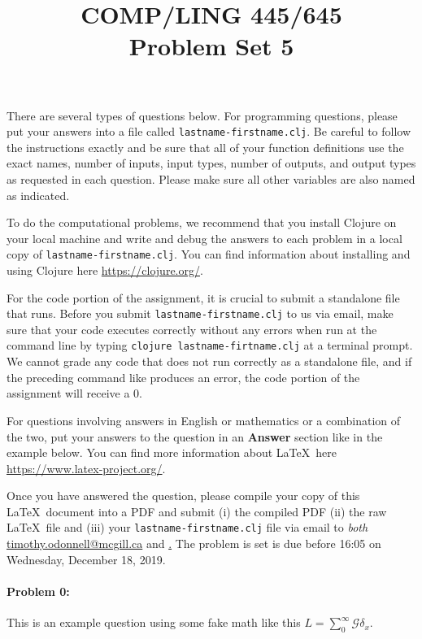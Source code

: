 \documentclass[10pt]{article}
\begin{document}
 
\title{COMP/LING 445/645\\Problem Set 5}
\date{}
\maketitle

There are several types of questions below. For programming questions,
please put your answers into a file called
\texttt{lastname-firstname.clj}. Be careful to follow the instructions
exactly and be sure that all of your function definitions use the
exact names, number of inputs, input types, number of outputs, and
output types as requested in each question. Please make sure all other
variables are also named as indicated.

To do the computational problems, we recommend that you install
Clojure on your local machine and write and debug the answers to each
problem in a local copy of \texttt{lastname-firstname.clj}. You can
find information about installing and using Clojure here
\url{https://clojure.org/}.

For the code portion of the assignment, it is crucial to submit a
standalone file that runs. Before you submit
\texttt{lastname-firstname.clj} to us via email, make sure that your
code executes correctly without any errors when run at the command
line by typing \texttt{clojure lastname-firtname.clj} at a terminal
prompt. We cannot grade any code that does not run correctly as a
standalone file, and if the preceding command like produces an error,
the code portion of the assignment will receive a $0$.

For questions involving answers in English or mathematics or a
combination of the two, put your answers to the question in an
\textbf{Answer} section like in the example below. You can find more
information about \LaTeX\ here \url{https://www.latex-project.org/}.

Once you have answered the question, please compile your copy of this
\LaTeX\ document into a PDF and submit (i) the compiled PDF (ii) the
raw \LaTeX\ file and (iii) your \texttt{lastname-firstname.clj} file
via email to \emph{both}
\href{mailto:timothy.odonnell@mcgill.ca}{timothy.odonnell@mcgill.ca}
and
\href{mailto:savanna.willerton@mail.mcgill.ca}\href{savanna.willerton@mail.mcgill.ca}.
The problem is set is due before 16:05 on Wednesday, December 18, 2019.

\hrulefill
\paragraph{Problem 0:}
This is an example question using some fake math like this
$L=\sum_0^{\infty} \mathcal{G} \delta_x$.
\end{document}
